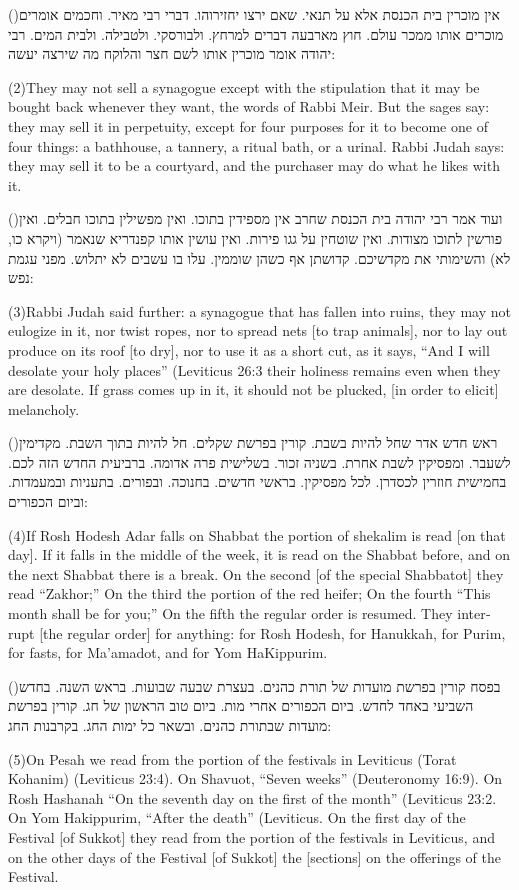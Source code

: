 \documentclass[12pt, openany]{book}
\newcommand{\sethebfont}{
\fontsize{10.5pt}{13.1pt} \selectfont
}
\newcommand{\hebeng}[2]{
	{\sethebfont #1\\}
	
	\begin{english}
		#2
	\end{english}
}
\newcommand{\vsnum}[1]{(\hebrewnumeral{#1})\space}
\newcommand{\vsnumeng}[1]{(#1)\space}
\begin{document}
\hebeng{\vsnum{2}אין מוכרין בית הכנסת אלא על תנאי. שאם ירצו יחזירוהו. דברי רבי מאיר. וחכמים אומרים מוכרים אותו ממכר עולם. חוץ מארבעה דברים למרחץ. ולבורסקי. ולטבילה. ולבית המים. רבי יהודה אומר מוכרין אותו לשם חצר והלוקח מה שירצה יעשה: }{\vsnumeng{2}They may not sell a synagogue except with the stipulation that it may be bought back whenever they want, the words of Rabbi Meir. But the sages say: they may sell it in perpetuity, except for four purposes for it to become one of four things: a bathhouse, a tannery, a ritual bath, or a urinal. Rabbi Judah says: they may sell it to be a courtyard, and the purchaser may do what he likes with it.}%

\hebeng{\vsnum{3}ועוד אמר רבי יהודה בית הכנסת שחרב אין מספידין בתוכו. ואין מפשילין בתוכו חבלים. ואין פורשין לתוכו מצודות. ואין שוטחין על גגו פירות. ואין עושין אותו קפנדריא שנאמר (ויקרא כו, לא) והשימותי את מקדשיכם. קדושתן אף כשהן שוממין. עלו בו עשבים לא יתלוש. מפני עגמת נפש: }{\vsnumeng{3}Rabbi Judah said further: a synagogue that has fallen into ruins, they may not eulogize in it, nor twist ropes, nor to spread nets {[to trap animals]}, nor to lay out produce on its roof {[to dry]}, nor to use it as a short cut, as it says, “And I will desolate your holy places” (Leviticus 26:3 their holiness remains even when they are desolate. If grass comes up in it, it should not be plucked, {[in order to elicit]} melancholy.}%

\hebeng{\vsnum{4}ראש חדש אדר שחל להיות בשבת. קורין בפרשת שקלים. חל להיות בתוך השבת. מקדימין לשעבר. ומפסיקין לשבת אחרת. בשניה זכור. בשלישית פרה אדומה. ברביעית החדש הזה לכם. בחמישית חוזרין לכסדרן. לכל מפסיקין. בראשי חדשים. בחנוכה. ובפורים. בתעניות ובמעמדות. וביום הכפורים: }{\vsnumeng{4}If Rosh Hodesh Adar falls on Shabbat the portion of shekalim is read {[on that day]}. If it falls in the middle of the week, it is read on the Shabbat before, and on the next Shabbat there is a break. On the second {[of the special Shabbatot]} they read “Zakhor;” On the third the portion of the red heifer; On the fourth “This month shall be for you;” On the fifth the regular order is resumed. They interrupt {[the regular order]} for anything: for Rosh Hodesh, for Hanukkah, for Purim, for fasts, for Ma’amadot, and for Yom HaKippurim.}%

\hebeng{\vsnum{5}בפסח קורין בפרשת מועדות של תורת כהנים. בעצרת שבעה שבועות. בראש השנה. בחדש השביעי באחד לחדש. ביום הכפורים אחרי מות. ביום טוב הראשון של חג. קורין בפרשת מועדות שבתורת כהנים. ובשאר כל ימות החג. בקרבנות החג: }{\vsnumeng{5}On Pesah we read from the portion of the festivals in Leviticus (Torat Kohanim) (Leviticus 23:4). On Shavuot, “Seven weeks” (Deuteronomy 16:9). On Rosh Hashanah “On the seventh day on the first of the month” (Leviticus 23:2. On Yom Hakippurim, “After the death” (Leviticus. On the first day of the Festival {[of Sukkot]} they read from the portion of the festivals in Leviticus, and on the other days of the Festival {[of Sukkot]} the {[sections]} on the offerings of the Festival.}%
\end{document}

